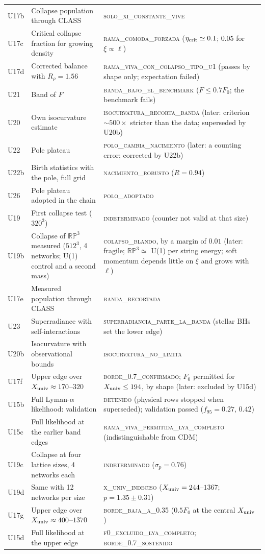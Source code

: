\documentclass[11pt,a4paper]{article}
\newcommand{\RP}{\mathbb{RP}^3}
\newcommand{\Xu}{X_{\rm univ}}
\begin{document}
\begin{small}
\begin{longtable}{L{1.3cm}L{6.0cm}L{7.0cm}}
U17b & Collapse population through CLASS & \textsc{solo\_xi\_constante\_vive} \\
U17c & Critical collapse fraction for growing density & \textsc{rama\_comoda\_forzada} ($\eta_{\rm crit}\simeq0.1$; 0.05 for $\xi\propto\ell$) \\
U17d & Corrected balance with $R_\rho=1.56$ & \textsc{rama\_viva\_con\_colapso\_tipo\_u1} (passes by shape only; expectation failed) \\
U21 & Band of $F$ & \textsc{banda\_bajo\_el\_benchmark} ($F\le0.7F_0$; the benchmark fails) \\
U20 & Own isocurvature estimate & \textsc{isocurvatura\_recorta\_banda} (later: criterion $\sim500\times$ stricter than the data; superseded by U20b) \\
U22 & Pole plateau & \textsc{polo\_cambia\_nacimiento} (later: a counting error; corrected by U22b) \\
U22b & Birth statistics with the pole, full grid & \textsc{nacimiento\_robusto} ($R=0.94$) \\
U26 & Pole plateau adopted in the chain & \textsc{polo\_adoptado} \\
U19 & First collapse test ($320^3$) & \textsc{indeterminado} (counter not valid at that size) \\
U19b & Collapse of $\RP$ measured ($512^3$, 4 networks; U(1) control and a second mass) & \textsc{colapso\_blando}, by a margin of $0.01$ (later: fragile; $\RP\simeq$ U(1) per string energy; soft momentum depends little on $\xi$ and grows with $\ell$) \\
U17e & Measured population through CLASS & \textsc{banda\_recortada} \\
U23 & Superradiance with self-interactions & \textsc{superradiancia\_parte\_la\_banda} (stellar BHs set the lower edge) \\
U20b & Isocurvature with observational bounds & \textsc{isocurvatura\_no\_limita} \\
U17f & Upper edge over $\Xu\approx170$--$320$ & \textsc{borde\_0.7\_confirmado}; $F_0$ permitted for $\Xu\le194$, by shape (later: excluded by U15d) \\
U15b & Full Lyman-$\alpha$ likelihood: validation & \textsc{detenido} (physical rows stopped when superseded); validation passed ($f_{95}=0.27$, $0.42$) \\
U15c & Full likelihood at the earlier band edges & \textsc{rama\_viva\_permitida\_lya\_completo} (indistinguishable from CDM) \\
U19c & Collapse at four lattice sizes, 4 networks each & \textsc{indeterminado} ($\sigma_p=0.76$) \\
U19d & Same with 12 networks per size & \textsc{x\_univ\_indeciso} ($\Xu=244$--$1367$; $p=1.35\pm0.31$) \\
U17g & Upper edge over $\Xu\approx400$--$1370$ & \textsc{borde\_baja\_a\_0.35} ($0.5F_0$ at the central $\Xu$) \\
U15d & Full likelihood at the upper edge & \textsc{f0\_excluido\_lya\_completo}; \textsc{borde\_0.7\_sostenido} \\
\end{longtable}
\end{small}



\end{document}
